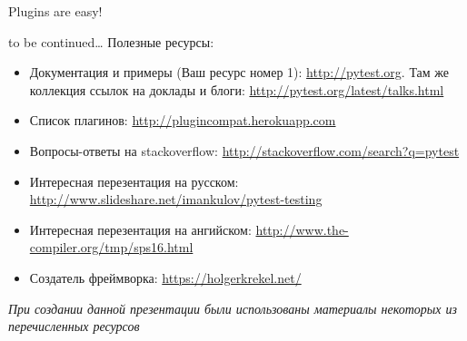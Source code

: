 \documentclass{beamer}
\begin{document}
\begin{frame}[fragile]{Plugins are easy!}
\end{frame}

\begin{frame}[fragile]{to be continued\ldots}
    Полезные ресурсы:
    \begin{itemize}
    \item Документация и примеры (Ваш ресурс номер 1): \url{http://pytest.org}.
    Там же коллекция ссылок на доклады и блоги: \url{http://pytest.org/latest/talks.html}
    \item Список плагинов: \url{http://plugincompat.herokuapp.com}
    \item Вопросы-ответы на stackoverflow: \url{http://stackoverflow.com/search?q=pytest}
    \item Интересная перезентация на русском: \url{http://www.slideshare.net/imankulov/pytest-testing}
    \item Интересная перезентация на ангийском: \url{http://www.the-compiler.org/tmp/sps16.html}
    \item Создатель фреймворка: \url{https://holgerkrekel.net/}
    \end{itemize}
    \footnotesize\emph{При создании данной презентации были использованы материалы некоторых из перечисленных ресурсов}
\end{frame}
\end{document}
